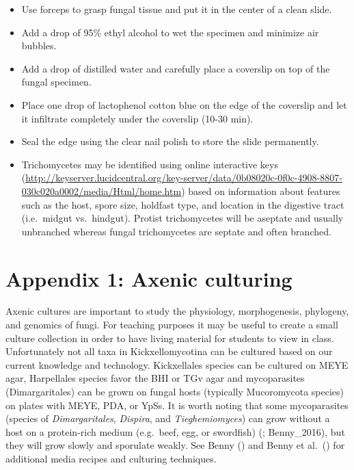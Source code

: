 \documentclass[]{book}
\providecommand{\tightlist}{%
  \setlength{\itemsep}{0pt}\setlength{\parskip}{0pt}}
\begin{document}
\begin{itemize}
\tightlist
\item
  Use forceps to grasp fungal tissue and put it in the center of a clean slide.
\item
  Add a drop of 95\% ethyl alcohol to wet the specimen and minimize air bubbles.
\item
  Add a drop of distilled water and carefully place a coverslip on top of the fungal specimen.
\item
  Place one drop of lactophenol cotton blue on the edge of the coverslip and let it infiltrate completely under the coverslip (10-30 min).
\item
  Seal the edge using the clear nail polish to store the slide permanently.
\item
  Trichomycetes may be identified using online interactive keys (\url{http://keyserver.lucidcentral.org/key-server/data/0b08020c-0f0c-4908-8807-030c020a0002/media/Html/home.htm}) based on information about features such as the host, spore size, holdfast type, and location in the digestive tract (i.e.~midgut vs.~hindgut). Protist trichomycetes will be aseptate and usually unbranched whereas fungal trichomycetes are septate and often branched.
\end{itemize}

\hypertarget{appendix-1-axenic-culturing}{%
\section{Appendix 1: Axenic culturing}\label{appendix-1-axenic-culturing}}

Axenic cultures are important to study the physiology, morphogenesis, phylogeny, and genomics of fungi. For teaching purposes it may be useful to create a small culture collection in order to have living material for students to view in class. Unfortunately not all taxa in Kickxellomycotina can be cultured based on our current knowledge and technology. Kickxellales species can be cultured on MEYE agar, Harpellales species favor the BHI or TGv agar and mycoparasites (Dimargaritales) can be grown on fungal hosts (typically Mucoromycota species) on plates with MEYE, PDA, or YpSs. It is worth noting that some mycoparasites (species of \emph{Dimargaritales}, \emph{Dispira}, and \emph{Tieghemiomyces}) can grow without a host on a protein-rich medium (e.g.~beef, egg, or swordfish) (\citet{Benny_2008}; Benny\_2016), but they will grow slowly and sporulate weakly. See Benny (\citeyearpar{Benny_2008}) and Benny et al.~(\citeyearpar{Benny_2016}) for additional media recipes and culturing techniques.
\end{document}
